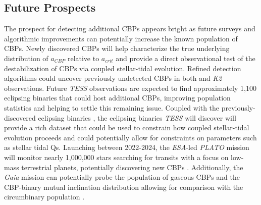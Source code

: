 
\subsection{Future Prospects}

The prospect for detecting additional CBPs appears bright as future surveys and algorithmic improvements can potentially increase the known population of CBPs.  Newly discovered CBPs will help characterize the true underlying distribution of $a_{CBP}$ relative to $a_{crit}$ and provide a direct observational test of the destabilization of CBPs via coupled stellar-tidal evolution.  Refined detection algorithms could uncover previously undetected CBPs in both \kepler and {\it K2} observations.  Future {\it TESS} observations are expected to find approximately 1,100 eclipsing binaries \citep{Sullivan2015} that could host additional CBPs, improving population statistics and helping to settle this remaining issue.  Coupled with the previously-discovered \kepler eclipsing binaries \citep{Kirk2016}, the eclipsing binaries {\it TESS} will discover will provide a rich dataset that could be used to constrain how coupled stellar-tidal evolution proceeds and could potentially allow for constraints on parameters such as stellar tidal Qs.  Launching between 2022-2024, the {\it ESA}-led {\it PLATO} mission will monitor nearly 1,000,000 stars searching for transits with a focus on low-mass terrestrial planets, potentially discovering new CBPs \citep{Rauer2014}.  Additionally, the {\it Gaia} mission can potentially probe the population of gaseous CBPs and the CBP-binary mutual inclination distribution allowing for comparison with the \kepler circumbinary population \citep{Sahlmann2015}.  

